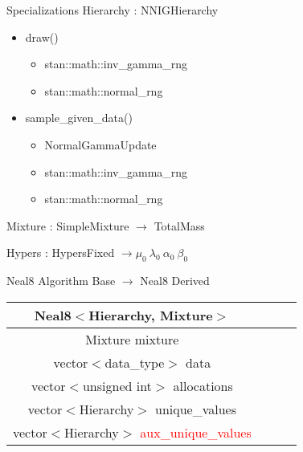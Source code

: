 \begin{frame}{Specializations}
Hierarchy : NNIGHierarchy
	\begin{itemize}
		\item draw()
		\begin{itemize}
			\item stan::math::inv\_gamma\_rng
			\item stan::math::normal\_rng
		\end{itemize}
		\item sample\_given\_data()
		\begin{itemize}
			\item NormalGammaUpdate
			\item stan::math::inv\_gamma\_rng
			\item stan::math::normal\_rng
		\end{itemize}
	\end{itemize}
Mixture : SimpleMixture $ \rightarrow$ TotalMass

Hypers : HypersFixed $ \rightarrow \mu_0 \ \lambda_0 \ \alpha_0 \ \beta_0 $

\end{frame}

\begin{frame}{Neal8}
 Algorithm Base $\rightarrow$ Neal8 Derived

\begin{center}
\begin{tabular}{ |c|c|c|c| } 
\hline
 Neal8$<$Hierarchy, Mixture$>$ \\
\hline
 Mixture mixture\\
 vector$<$data\_type$>$ data  \\ 
 vector$<$unsigned int$>$ allocations  \\
 vector$<$Hierarchy$>$ unique\_values \\
 vector$<$Hierarchy$>$ \textcolor{red}{aux\_unique\_values} \\
\hline
\end{tabular}
\end{center}

\end{frame}


